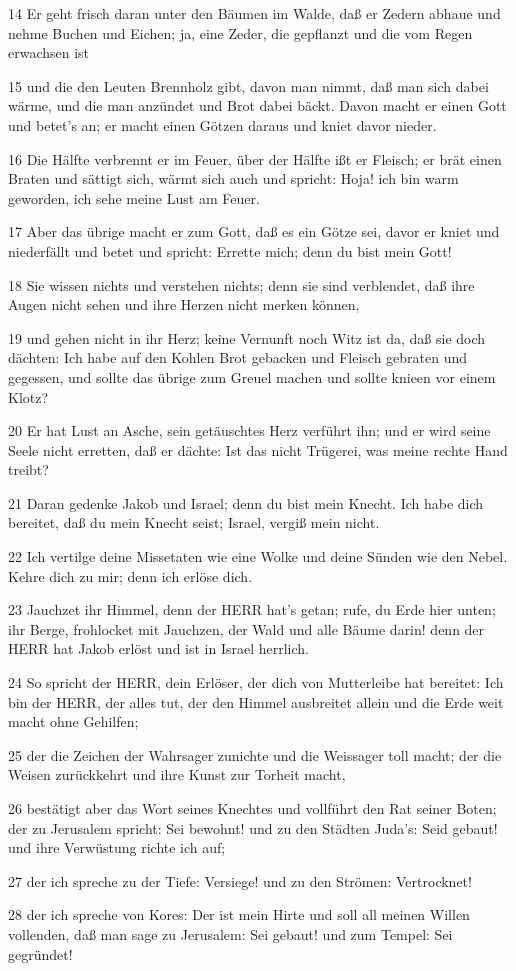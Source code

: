 \par 14 Er geht frisch daran unter den Bäumen im Walde, daß er Zedern abhaue und nehme Buchen und Eichen; ja, eine Zeder, die gepflanzt und die vom Regen erwachsen ist
\par 15 und die den Leuten Brennholz gibt, davon man nimmt, daß man sich dabei wärme, und die man anzündet und Brot dabei bäckt. Davon macht er einen Gott und betet's an; er macht einen Götzen daraus und kniet davor nieder.
\par 16 Die Hälfte verbrennt er im Feuer, über der Hälfte ißt er Fleisch; er brät einen Braten und sättigt sich, wärmt sich auch und spricht: Hoja! ich bin warm geworden, ich sehe meine Lust am Feuer.
\par 17 Aber das übrige macht er zum Gott, daß es ein Götze sei, davor er kniet und niederfällt und betet und spricht: Errette mich; denn du bist mein Gott!
\par 18 Sie wissen nichts und verstehen nichts; denn sie sind verblendet, daß ihre Augen nicht sehen und ihre Herzen nicht merken können,
\par 19 und gehen nicht in ihr Herz; keine Vernunft noch Witz ist da, daß sie doch dächten: Ich habe auf den Kohlen Brot gebacken und Fleisch gebraten und gegessen, und sollte das übrige zum Greuel machen und sollte knieen vor einem Klotz?
\par 20 Er hat Lust an Asche, sein getäuschtes Herz verführt ihn; und er wird seine Seele nicht erretten, daß er dächte: Ist das nicht Trügerei, was meine rechte Hand treibt?
\par 21 Daran gedenke Jakob und Israel; denn du bist mein Knecht. Ich habe dich bereitet, daß du mein Knecht seist; Israel, vergiß mein nicht.
\par 22 Ich vertilge deine Missetaten wie eine Wolke und deine Sünden wie den Nebel. Kehre dich zu mir; denn ich erlöse dich.
\par 23 Jauchzet ihr Himmel, denn der HERR hat's getan; rufe, du Erde hier unten; ihr Berge, frohlocket mit Jauchzen, der Wald und alle Bäume darin! denn der HERR hat Jakob erlöst und ist in Israel herrlich.
\par 24 So spricht der HERR, dein Erlöser, der dich von Mutterleibe hat bereitet: Ich bin der HERR, der alles tut, der den Himmel ausbreitet allein und die Erde weit macht ohne Gehilfen;
\par 25 der die Zeichen der Wahrsager zunichte und die Weissager toll macht; der die Weisen zurückkehrt und ihre Kunst zur Torheit macht,
\par 26 bestätigt aber das Wort seines Knechtes und vollführt den Rat seiner Boten; der zu Jerusalem spricht: Sei bewohnt! und zu den Städten Juda's: Seid gebaut! und ihre Verwüstung richte ich auf;
\par 27 der ich spreche zu der Tiefe: Versiege! und zu den Strömen: Vertrocknet!
\par 28 der ich spreche von Kores: Der ist mein Hirte und soll all meinen Willen vollenden, daß man sage zu Jerusalem: Sei gebaut! und zum Tempel: Sei gegründet!

